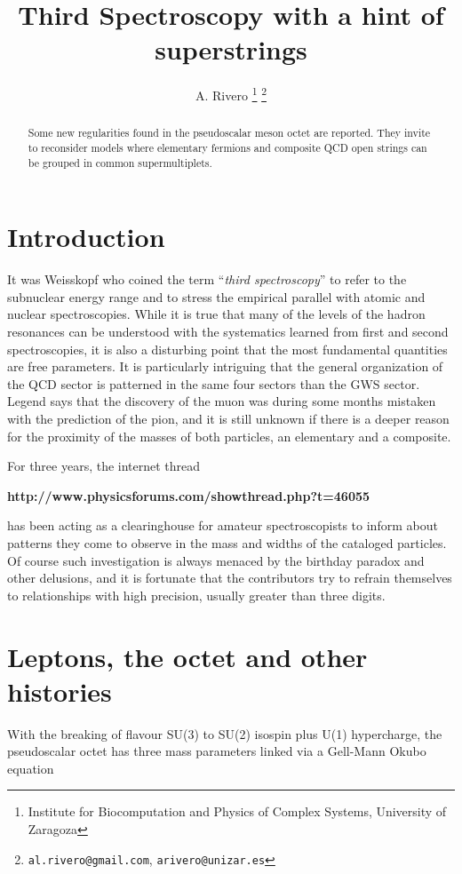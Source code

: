 \documentclass[a4paper,10pt]{article}
\title{Third Spectroscopy with a hint of superstrings}
\author{A. Rivero \thanks{Institute for Biocomputation and
Physics of Complex Systems, University of Zaragoza} \thanks{\texttt{al.rivero@gmail.com}, \texttt{arivero@unizar.es}}}
\begin{document}
\maketitle

\begin{abstract}
Some new regularities found in the pseudoscalar meson octet are reported. They invite to reconsider models where elementary fermions and composite QCD open strings can be grouped in common supermultiplets.
\end{abstract}

\section{Introduction}

It was Weisskopf who coined the term ``\textit{third spectroscopy}'' to refer to the subnuclear energy range and to stress the empirical parallel with atomic and nuclear spectroscopies. While it is true that many of the levels of the hadron resonances can be understood with the systematics learned from first and second spectroscopies, it is also a disturbing point that the most fundamental quantities are free parameters. It is particularly intriguing that the general organization of the QCD sector is patterned in the same four sectors than the GWS sector. Legend says that the discovery of the muon was during some months mistaken with the prediction of the pion, and it is still unknown if there is a deeper reason for the proximity of the masses of both particles, an elementary and a composite.

For three years, the internet thread

\textbf{http://www.physicsforums.com/showthread.php?t=46055}

has been acting as a clearinghouse for amateur spectroscopists to inform about patterns they come to observe in the mass and widths of the cataloged particles. Of course such investigation is always menaced by the birthday paradox and other delusions, and it is fortunate that the contributors try to refrain themselves to relationships with high precision, usually greater than three digits. 

\section{Leptons, the octet and other histories}

With the breaking of flavour SU(3) to SU(2) isospin plus U(1) hypercharge, the pseudoscalar octet has three mass parameters linked via a Gell-Mann Okubo equation
\end{document}
